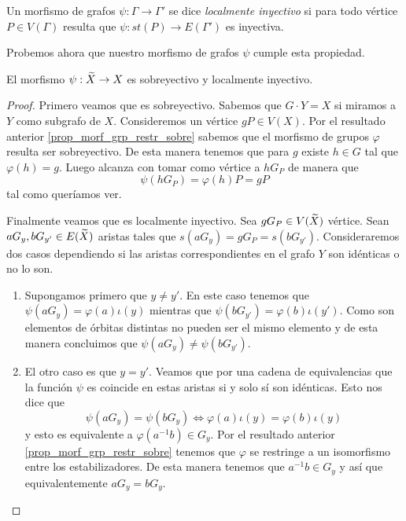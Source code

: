 \documentclass[tesis.tex]{subfiles}
\begin{document}
\begin{deff}
	Un morfismo de grafos $\psi:\Gamma \to \Gamma'$ se dice \emph{localmente inyectivo} si para todo vértice $P \in V(\Gamma)$ resulta que $\psi: st(P) \to E(\Gamma')$ es inyectiva. 
\end{deff}

Probemos ahora que nuestro morfismo de grafos $\psi$ cumple esta propiedad.

\begin{prop}
	El morfismo $\psi: \widetilde X \to X$ es sobreyectivo y localmente inyectivo.
\end{prop}
\begin{proof}
	Primero veamos que es sobreyectivo.
	Sabemos que $G \cdot Y = X$ si miramos a $Y$ como subgrafo de $X$.
	Consideremos un vértice $gP \in V(X)$. 
	Por el resultado anterior \ref{prop_morf_grp_restr_sobre} sabemos que el morfismo de grupos $\varphi$ resulta ser sobreyectivo.
	De esta manera tenemos que para $g$ existe $h \in G$ tal que $\varphi(h) = g$. 
	Luego alcanza con tomar como vértice a $h G_P $ de manera que 
	\[
	\psi(h G_P ) = \varphi(h) P = g P 
	\]
	tal como queríamos ver.
	
	
	Finalmente veamos que es localmente inyectivo.
	Sea $gG_{P} \in V(\widetilde X)$ vértice. 
	Sean $aG_{y},bG_{y' }\in E(\widetilde X)$ aristas tales que $s(aG_{y}) = gG_{P} = s(bG_{y' })$.
	Consideraremos dos casos dependiendo si las aristas correspondientes en el grafo $Y$ son idénticas o no lo son.
	
	\begin{enumerate}
		\item Supongamos primero que $y \neq y'$.
		En este caso tenemos que $\psi(aG_{y}) = \varphi(a) \iota (y)$ mientras que $\psi(bG_{y'}) = \varphi(b) \iota (y')$.
		Como son elementos de órbitas distintas no pueden ser el mismo elemento y de esta manera concluimos que $\psi(aG_{y}) \neq \psi(bG_{y'}).$
		
		\item El otro caso es que $y=y'$. 
		Veamos que por una cadena de equivalencias que la función $\psi$ es coincide en estas aristas si y solo sí son idénticas.
		Esto nos dice que
		\[
			\psi(aG_{y}) = \psi(bG_{y}) \iff \varphi(a) \iota(y) = \varphi(b)\iota(y)
		\]
		y esto es equivalente a $\varphi(a^{-1}b) \in G_{y}$.
		Por el resultado anterior \ref{prop_morf_grp_restr_sobre} tenemos que $\varphi$ se restringe a un isomorfismo entre los estabilizadores.
		De esta manera tenemos que $a^{-1}b \in G_{y}$ y así que equivalentemente $aG_{y} = bG_{y}$.
		
	\end{enumerate}
\end{proof}
\end{document}
